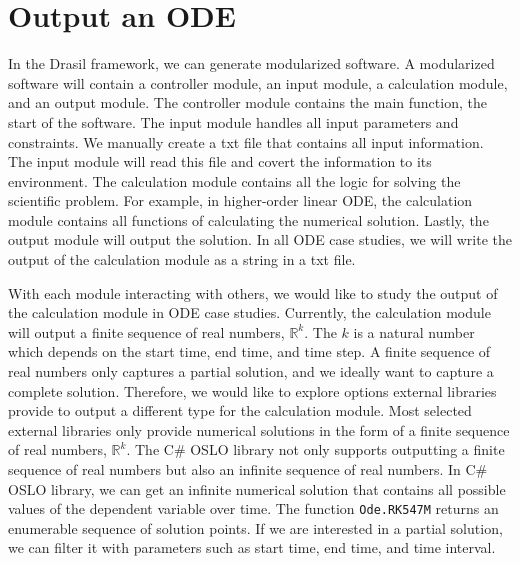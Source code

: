 \section{Output an ODE}
In the Drasil framework, we can generate modularized software. A modularized software will contain a controller module, an input module, a calculation module, and an output module. The controller module contains the main function, the start of the software. The input module handles all input parameters and constraints. We manually create a txt file that contains all input information. The input module will read this file and covert the information to its environment. The calculation module contains all the logic for solving the scientific problem. For example, in higher-order linear ODE, the calculation module contains all functions of calculating the numerical solution. Lastly, the output module will output the solution. In all ODE case studies, we will write the output of the calculation module as a string in a txt file. 

With each module interacting with others, we would like to study the output of the calculation module in ODE case studies. Currently, the calculation module will output a finite sequence of real numbers, $\mathbb{R}^k$. The $k$ is a natural number which depends on the start time, end time, and time step. A finite sequence of real numbers only captures a partial solution, and we ideally want to capture a complete solution. Therefore, we would like to explore options external libraries provide to output a different type for the calculation module. Most selected external libraries only provide numerical solutions in the form of a finite sequence of real numbers, $\mathbb{R}^k$. The C\# OSLO library not only supports outputting a finite sequence of real numbers but also an infinite sequence of real numbers. In C\# OSLO library, we can get an infinite numerical solution that contains all possible values of the dependent variable over time. The function \verb|Ode.RK547M| returns an enumerable sequence of solution points. If we are interested in a partial solution, we can filter it with parameters such as start time, end time, and time interval.



